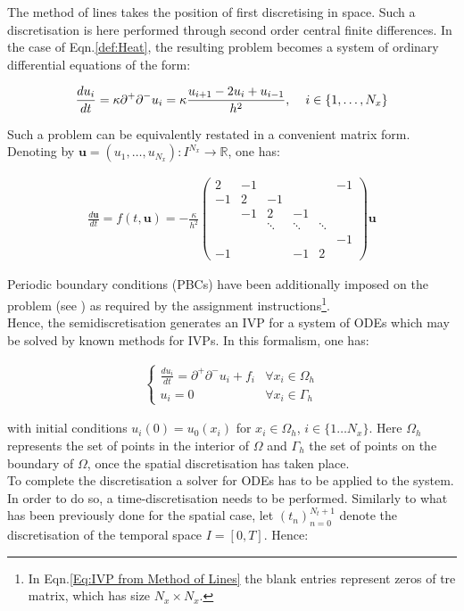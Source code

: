 \documentclass[11pt]{article}
\theoremstyle{theorem}
\theoremstyle{definition}
\begin{document}
The method of lines takes the position of first discretising in space. Such a discretisation is here performed through second order central finite differences. In the case of Eqn.\eqref{def:Heat}, the resulting problem becomes a system of ordinary differential equations of the form:

\begin{align*}
	\frac{du_i}{dt} = \kappa \partial^+\partial^- u_i = \kappa\frac{u_{i+1} - 2u_i + u_{i-1}}{h^2},\hspace{4mm} i\in\lbrace 1,\ldots, N_x\rbrace
\end{align*}

Such a problem can be equivalently restated in a convenient matrix form. Denoting by $ \mathbf{u} = (u_1,\ldots,u_{N_x}) : I^{N_x} \to \mathbb{R} $, one has:

\begin{align}\label{Eq:IVP from Method of Lines}
\frac{d\mathbf{u}}{dt} = f(t,\mathbf{u}) = -\frac{\kappa}{h^2}
\begin{pmatrix}
2 & -1 & & & & -1\\
-1 & 2 & -1 & & & \\
& -1 & 2 & -1 & & \\
& & \ddots & \ddots & \ddots & \\
& & & & & -1 \\
-1 & & & -1 & 2
\end{pmatrix}
\mathbf{u} 
\end{align}

Periodic boundary conditions (PBCs) have been additionally imposed on the problem (see \cite{lec-notes}) as required by the assignment instructions\footnote{In Eqn.\eqref{Eq:IVP from Method of Lines} the blank entries represent zeros of tre matrix, which has size $N_x\times N_x$.}.\\
Hence, the semidiscretisation generates an IVP for a system of ODEs which may be solved by known methods for IVPs. In this formalism, one has:


\begin{align}
\label{eqn:lines}
\begin{cases}
	\frac{du_i}{dt}=\partial^+\partial^-u_i+f_i &\forall x_i\in\Omega_h\\
	u_i=0 &\forall x_i\in\Gamma_h
\end{cases}
\end{align} 

with initial conditions $u_i(0)=u_0(x_i)$ for $x_i\in\Omega_h$, $i\in\lbrace 1\ldots N_x\rbrace$. Here $\Omega_h$ represents the set of points in the interior of $\Omega$ and $\Gamma_h$ the set of points on the boundary of $\Omega$, once the spatial discretisation has taken place.\\
To complete the discretisation a solver for ODEs has to be applied to the system. In order to do so, a time-discretisation needs to be performed. Similarly to what has been previously done for the spatial case, let $ (t_n)_{n = 0}^{N_t + 1} $ denote the discretisation of the temporal space $ I = [0,T] $. Hence:
\end{document}
